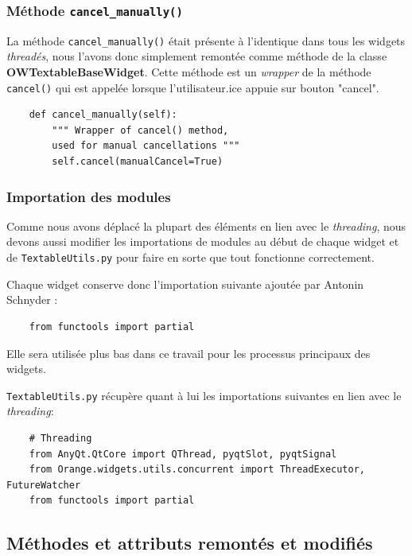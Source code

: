\documentclass{article}
\begin{document}
\subsubsection{Méthode \texttt{cancel\_manually()}}

La méthode \texttt{cancel\_manually()} était présente à l'identique dans tous les widgets \textit{threadés}, nous l'avons donc simplement remontée comme méthode de la classe \textbf{OWTextableBaseWidget}. Cette méthode est un \textit{wrapper} de la méthode \texttt{cancel()} qui est appelée lorsque l'utilisateur.ice appuie sur bouton "cancel".

\begin{verbatim}
    def cancel_manually(self):
        """ Wrapper of cancel() method,
        used for manual cancellations """
        self.cancel(manualCancel=True)
\end{verbatim}

\subsubsection{Importation des modules}

Comme nous avons déplacé la plupart des éléments en lien avec le \textit{threading}, nous devons aussi modifier les importations de modules au début de chaque widget et de \texttt{TextableUtils.py} pour faire en sorte que tout fonctionne correctement.

Chaque widget conserve donc l'importation suivante ajoutée par Antonin Schnyder : 

\begin{verbatim}
    from functools import partial
\end{verbatim}

Elle sera utilisée plus bas dans ce travail pour les processus principaux des widgets.

\texttt{TextableUtils.py} récupère quant à lui les importations suivantes en lien avec le \textit{threading}:

\begin{verbatim}
    # Threading
    from AnyQt.QtCore import QThread, pyqtSlot, pyqtSignal
    from Orange.widgets.utils.concurrent import ThreadExecutor, FutureWatcher
    from functools import partial
\end{verbatim}



\subsection{Méthodes et attributs remontés et modifiés}
\end{document}
